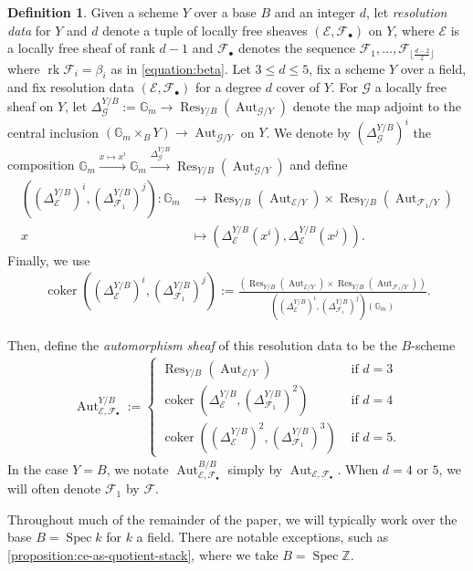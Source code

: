 \documentclass[12 pt]{amsart}
\newcommand{\rboxed}[1]{#1}
\theoremstyle{plain}
\theoremstyle{definition}
\newtheorem{definition}[theorem]{Definition}
\theoremstyle{remark}
\numberwithin{equation}{section}
\newcommand\bg{\mathbb G}
\newcommand\bz{\mathbb Z}
\newcommand\sce{\mathscr E}
\newcommand\scf{\mathscr F}
\newcommand\scg{\mathscr G}
\DeclareMathOperator\spec{\operatorname{Spec}}
\DeclareMathOperator\res{Res}
\DeclareMathOperator\coker{coker}
\DeclareMathOperator\rk{rk}
\DeclareMathOperator\aut{Aut}
\begin{document}
\begin{definition} \label{definition:automorphism} Given a scheme $Y$ over a
	base $B$ and an integer $d$, let {\em resolution data} for $Y$ and $d$
	denote a tuple of locally free sheaves $(\sce, \scf_\bullet)$ on $Y$,
	where $\sce$ is a locally free sheaf of rank $d-1$ and
	$\rboxed{\scf_\bullet}$ denotes the sequence $\scf_1, \ldots,
	\scf_{\lfloor \frac{d-2}{2} \rfloor}$ where $\rk \scf_i = \beta_i$ as in \eqref{equation:beta}.
		Let $3 \leq d \leq 5$, fix a scheme $Y$ over a field, and fix resolution
	data $(\sce, \scf_\bullet)$ for a degree $d$ cover of $Y$.  For $\scg$ a
	locally free sheaf on $Y$, let $\rboxed{\Delta_\scg^{Y/B}} := \bg_m \to
	\res_{Y/B}(\aut_{\scg/Y})$ denote the map adjoint to the central
	inclusion $(\bg_m \times_B Y)  \to \aut_{\scg/Y}$ on $Y$.
	We denote by $\left(\Delta_\scg^{Y/B} \right)^i$ the composition $\bg_m \xrightarrow{x
	\mapsto x^i} \bg_m \xrightarrow{\Delta_\scg^{Y/B}} \res_{Y/B}(\aut_{\scg/Y})$
	and define
	\begin{align*}
		\left( \left(\Delta_\sce^{Y/B}\right)^i,
	\left(\Delta_{\scf_1}^{Y/B}\right)^{j}\right) : \bg_m & \rightarrow \res_{Y/B}(\aut_{\sce/Y})
	\times
\res_{Y/B}(\aut_{\scf_1/Y})\\
x & \mapsto \left(\Delta_{\sce}^{Y/B}(x^i), \Delta_{\sce}^{Y/B}(x^j) \right).
	\end{align*}
	Finally, we use 
	\begin{align*}
	\coker\left(\left(\Delta_\sce^{Y/B}\right)^i,
\left(\Delta_{\scf_1}^{Y/B}\right)^{j} \right) := \frac{\left( \res_{Y/B}(\aut_{\sce/Y})
	\times
\res_{Y/B}(\aut_{\scf_1/Y}) \right) }{ \left(\left(\Delta_\sce^{Y/B}\right)^i,
\left(\Delta_{\scf_1}^{Y/B}\right)^{j}\right)(\bg_m)}.
	\end{align*}

	Then, define the {\em automorphism sheaf} of this resolution data to be
	the $B$-scheme \begin{align} \label{equation:aut-groups}
		\rboxed{\aut_{\sce, \scf_\bullet}^{Y/B}} := \begin{cases}
			\res_{Y/B}(\aut_{\sce/Y}) & \text{ if } d = 3 \\
			\coker(\Delta_\sce^{Y/B}, (\Delta_{\scf_1}^{Y/B})^{2}) &
			\text{ if } d= 4 \\ 
			\coker((\Delta_\sce^{Y/B})^2,
	(\Delta_{\scf_1}^{Y/B})^3) & \text{ if } d= 5.  \end{cases} 
\end{align} In
	the case $Y = B$, we notate $\aut_{\sce, \scf_\bullet}^{B/B}$ simply by
	$\aut_{\sce, \scf_\bullet}$.
	When $d =4$ or $5$, we will often denote $\scf_1$ by $\scf$.
\end{definition}
Throughout much of the remainder of the paper, we will typically work over the
base $B = \spec k$ for $k$ a field. 
There are notable exceptions, such as
\autoref{proposition:ce-as-quotient-stack}, where we take $B = \spec \bz$.
\end{document}
